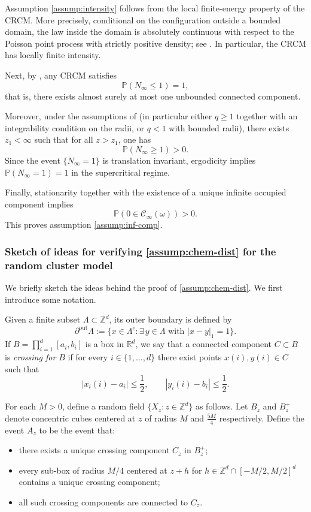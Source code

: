 \documentclass[11pt]{article}
\newcommand{\R}{\mathbb R}
\newcommand{\Z}{\mathbb Z}
\renewcommand{\P}{\mathbb P}
\theoremstyle{rem}
\begin{document}
Assumption \ref{assump:intensity} follows from the local finite-energy property of the CRCM. More precisely, conditional on the configuration outside a bounded domain, the law inside the domain is absolutely continuous with respect to the Poisson point process with strictly positive density; see \cite[Lemma 7.1]{H18}. In particular, the CRCM has locally finite intensity.

Next, by \cite[Theorem 1]{H18}, any CRCM satisfies
\[
\P(N_\infty\le1)=1,
\]
that is, there exists almost surely at most one unbounded connected component.

Moreover, under the assumptions of \cite[Theorem 1]{H18} (in particular either $q\ge1$ together with an integrability condition on the radii, or $q<1$ with bounded radii), there exists $z_1<\infty$
such that for all
$z>z_1$, one has
\[
\P(N_\infty\ge1)>0.
\]
Since the event
$\{N_\infty=1\}$
is translation invariant, ergodicity implies
$\P(N_\infty=1)=1$
in the supercritical regime.

Finally, stationarity together with the existence of a unique infinite occupied component implies
\[
\P(0\in\mathcal C_\infty(\omega))>0.
\]
This proves assumption \ref{assump:inf-comp}.

\subsubsection{Sketch of ideas for verifying \ref{assump:chem-dist} for the random cluster model}
\label{subsec sketch P4}

We briefly sketch the ideas behind the proof of \ref{assump:chem-dist}. We first introduce some notation.


Given a finite subset
$\Lambda\subset\Z^d$,
its outer boundary is defined by
\[
\partial^{\mathrm{out}}\Lambda
:=
\{
x\in\Lambda^c:
\exists\,y\in\Lambda
\text{ with }
|x-y|_1=1
\}.
\]
If $B=\prod_{i=1}^d[a_i,b_i]$
is a box in $\R^d$, we say that a connected component
$C\subset B$
is {\it crossing for $B$} if for every
$i\in\{1,\dots,d\}$ there exist points
$x(i),y(i)\in C$
such that
\[
|x_i(i)-a_i|\le\frac12,
\qquad
|y_i(i)-b_i|\le\frac12.
\]


For each $M>0$, define a random field
$
\{X_z:z\in\Z^d\}
$
as follows. Let $B_z$ and $B_z^+$ denote concentric cubes centered at $z$ of radius
$M$ and $\frac{5M}{4}$ respectively. Define the event
$A_z$ to be the event that:
\begin{itemize}
\item
there exists a unique crossing component
$C_z$
in $B_z^+$;

\item
every sub-box of radius $M/4$ centered at
$z+h$ for 
$h\in\Z^d\cap[-M/2,M/2]^d$
contains a unique crossing component;

\item
all such crossing components are connected to $C_z$.
\end{itemize}
\end{document}
